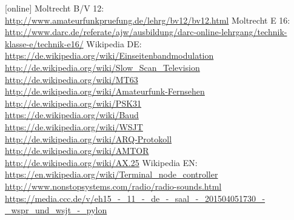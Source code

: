 \begin{thebibliography}{}
    [online]
    Moltrecht B/V 12: \\
    \url{http://www.amateurfunkpruefung.de/lehrg/bv12/bv12.html}
     Moltrecht E 16: \\
    \url{http://www.darc.de/referate/ajw/ausbildung/darc-online-lehrgang/technik-klasse-e/technik-e16/}
      Wikipedia DE: \\
    \url{https://de.wikipedia.org/wiki/Einseitenbandmodulation}\\
    \url{http://de.wikipedia.org/wiki/Slow_Scan_Television}\\
    \url{http://de.wikipedia.org/wiki/MT63}\\
    \url{http://de.wikipedia.org/wiki/Amateurfunk-Fernsehen}\\
    \url{http://de.wikipedia.org/wiki/PSK31}\\
    \url{https://de.wikipedia.org/wiki/Baud}\\
    \url{https://de.wikipedia.org/wiki/WSJT}\\
    \url{http://de.wikipedia.org/wiki/ARQ-Protokoll}\\
    \url{http://de.wikipedia.org/wiki/AMTOR}\\
    \url{http://de.wikipedia.org/wiki/AX.25}
      Wikipedia EN: \\
    \url{https://en.wikipedia.org/wiki/Terminal_node_controller}
     \url{http://www.nonstopsystems.com/radio/radio-sounds.html}
    \url{https://media.ccc.de/v/eh15_-_11_-_de_-_saal_-_201504051730_-_wspr_und_wsjt_-_pylon}
\end{thebibliography}


